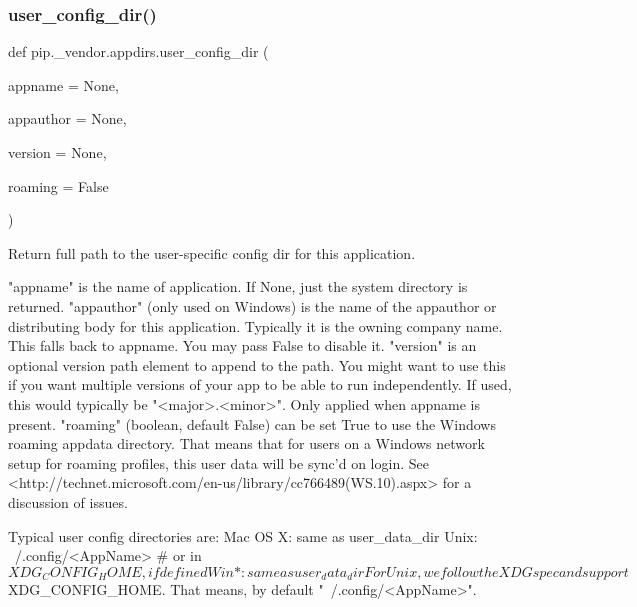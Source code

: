 \subsubsection{\texorpdfstring{user\+\_\+config\+\_\+dir()}{user\_config\_dir()}}
{\footnotesize\ttfamily def pip.\+\_\+vendor.\+appdirs.\+user\+\_\+config\+\_\+dir (\begin{DoxyParamCaption}\item[{}]{appname = {\ttfamily None},  }\item[{}]{appauthor = {\ttfamily None},  }\item[{}]{version = {\ttfamily None},  }\item[{}]{roaming = {\ttfamily False} }\end{DoxyParamCaption})}

\begin{DoxyVerb}Return full path to the user-specific config dir for this application.

    "appname" is the name of application.
        If None, just the system directory is returned.
    "appauthor" (only used on Windows) is the name of the
        appauthor or distributing body for this application. Typically
        it is the owning company name. This falls back to appname. You may
        pass False to disable it.
    "version" is an optional version path element to append to the
        path. You might want to use this if you want multiple versions
        of your app to be able to run independently. If used, this
        would typically be "<major>.<minor>".
        Only applied when appname is present.
    "roaming" (boolean, default False) can be set True to use the Windows
        roaming appdata directory. That means that for users on a Windows
        network setup for roaming profiles, this user data will be
        sync'd on login. See
        <http://technet.microsoft.com/en-us/library/cc766489(WS.10).aspx>
        for a discussion of issues.

Typical user config directories are:
    Mac OS X:               same as user_data_dir
    Unix:                   ~/.config/<AppName>     # or in $XDG_CONFIG_HOME, if defined
    Win *:                  same as user_data_dir

For Unix, we follow the XDG spec and support $XDG_CONFIG_HOME.
That means, by default "~/.config/<AppName>".
\end{DoxyVerb}
 \mbox{\label{namespacepip_1_1__vendor_1_1appdirs_a451d624e285b0b0d5d1252ee67626d11}} 
